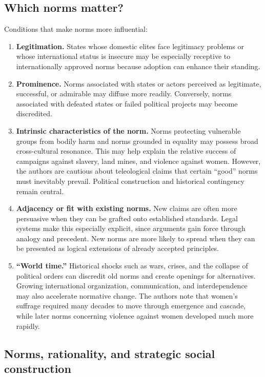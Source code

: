 \subsection{Which norms matter?}

Conditions that make norms more influential:
\begin{enumerate}
    \item \textbf{Legitimation.} States whose domestic elites face legitimacy problems or whose international status is insecure may be especially receptive to internationally approved norms because adoption can enhance their standing.

    \item \textbf{Prominence.} Norms associated with states or actors perceived as legitimate, successful, or admirable may diffuse more readily. Conversely, norms associated with defeated states or failed political projects may become discredited.

    \item \textbf{Intrinsic characteristics of the norm.} Norms protecting vulnerable groups from bodily harm and norms grounded in equality may possess broad cross-cultural resonance. This may help explain the relative success of campaigns against slavery, land mines, and violence against women. However, the authors are cautious about teleological claims that certain ``good'' norms must inevitably prevail. Political construction and historical contingency remain central.

    \item \textbf{Adjacency or fit with existing norms.} New claims are often more persuasive when they can be grafted onto established standards. Legal systems make this especially explicit, since arguments gain force through analogy and precedent. New norms are more likely to spread when they can be presented as logical extensions of already accepted principles.

    \item \textbf{``World time.''} Historical shocks such as wars, crises, and the collapse of political orders can discredit old norms and create openings for alternatives. Growing international organization, communication, and interdependence may also accelerate normative change. The authors note that women's suffrage required many decades to move through emergence and cascade, while later norms concerning violence against women developed much more rapidly.
\end{enumerate}

\subsection{Norms, rationality, and strategic social construction}

